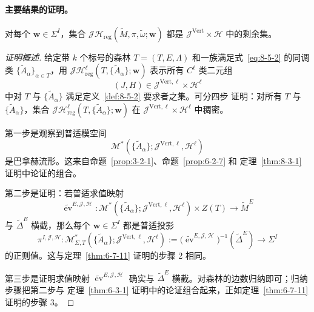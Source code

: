 \paragraph{主要结果的证明。}

\begin{theorem}\label{thm:8-5-3}
对每个 $\mathbf w\in\Sigma^I$，集合
$\mathcal J\mathcal H_{\mathrm{reg}}
(\widetilde M,\pi,\widetilde\omega;\mathbf w)$ 都是
$\mathcal J^{\mathrm{Vert}}\times\mathcal H$ 中的剩余集。
\end{theorem}

\begin{proof}[证明概述]
给定带 $k$ 个标号的森林 $T=(T,E,\Lambda)$ 和一族满足式~\eqref{eq:8-5-2} 的同调类
$\{\widetilde A_\alpha\}_{\alpha\in T}$，用
$\mathcal J\mathcal H^\ell_{\mathrm{reg}}
(T,\{\widetilde A_\alpha\};\mathbf w)$ 表示所有 $C^\ell$ 类二元组
\[
  (J,H)\in\mathcal J^{\mathrm{Vert},\ell}\times\mathcal H^\ell
\]
中对 $T$ 与 $\{\widetilde A_\alpha\}$ 满足定义~\ref{def:8-5-2} 要求者之集。可分四步
证明：对所有 $T$ 与 $\{\widetilde A_\alpha\}$，集合
$\mathcal J\mathcal H^\ell_{\mathrm{reg}}
(T,\{\widetilde A_\alpha\};\mathbf w)$ 在
$\mathcal J^{\mathrm{Vert},\ell}\times\mathcal H^\ell$ 中稠密。

第一步是观察到普适模空间
\[
  \mathcal M^*(\{\widetilde A_\alpha\};
    \mathcal J^{\mathrm{Vert},\ell},\mathcal H^\ell)
\]
是巴拿赫流形。这来自命题~\ref{prop:3-2-1}、命题~\ref{prop:6-2-7} 和
定理~\ref{thm:8-3-1} 证明中论证的组合。

第二步是证明：若普适求值映射
\[
  \widetilde{\operatorname{ev}}^{E,\mathcal J,\mathcal H}:
  \mathcal M^*(\{\widetilde A_\alpha\};
    \mathcal J^{\mathrm{Vert},\ell},\mathcal H^\ell)
  \times Z(T)\longrightarrow\widetilde M^E
\]
与 $\widetilde\Delta^E$ 横截，那么每个 $\mathbf w\in\Sigma^I$ 都是普适投影
\[
  \pi^{I,\mathcal J,\mathcal H}:
  \mathcal M^*_{\Sigma,T}
  (\{\widetilde A_\alpha\};
    \mathcal J^{\mathrm{Vert},\ell},\mathcal H^\ell)
  :=\bigl(\widetilde{\operatorname{ev}}^{E,\mathcal J,\mathcal H}\bigr)^{-1}
    (\widetilde\Delta^E)
  \longrightarrow\Sigma^I
\]
的正则值。这与定理~\ref{thm:6-7-11} 证明的步骤 2 相同。

第三步是证明求值映射
$\widetilde{\operatorname{ev}}^{E,\mathcal J,\mathcal H}$ 确实与
$\widetilde\Delta^E$ 横截。对森林的边数归纳即可；归纳步骤把第二步与
定理~\ref{thm:6-3-1} 证明中的论证组合起来，正如定理~\ref{thm:6-7-11} 证明的步骤 3。


\end{proof}
